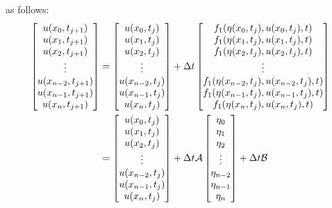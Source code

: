 \documentclass[10pt,reqno,oneside,a4paper]{article}
\begin{document}
as follows:
\begin{align*}
\begin{bmatrix}
u(x_0, t_{j+1}) \\
u(x_1, t_{j+1}) \\
u(x_2, t_{j+1}) \\
\vdots \\
u(x_{n-2}, t_{j+1}) \\
u(x_{n-1}, t_{j+1}) \\
u(x_n, t_{j+1}) 
\end{bmatrix} 
&= 
\begin{bmatrix}
u(x_0, t_{j}) \\
u(x_1, t_{j}) \\
u(x_2, t_{j}) \\
\vdots \\
u(x_{n-2}, t_{j}) \\
u(x_{n-1}, t_{j}) \\
u(x_n, t_{j}) 
\end{bmatrix} 
+ \Delta t 
\begin{bmatrix}
f_1(\eta(x_0, t_j), u(x_0, t_j), t)\\
f_1(\eta(x_1, t_j), u(x_1, t_j), t) \\
 f_1(\eta(x_2, t_j), u(x_2, t_j), t) \\
\vdots \\
f_1(\eta(x_{n-2}, t_j), u(x_{n-2}, t_j), t)\\
f_1(\eta(x_{n-1}, t_j), u(x_{n-1}, t_j), t) \\
f_1(\eta(x_n, t_j), u(x_n, t_j), t) 
\end{bmatrix} \\
&= 
\begin{bmatrix}
u(x_0, t_{j}) \\
u(x_1, t_{j}) \\
u(x_2, t_{j}) \\
\vdots \\
u(x_{n-2}, t_{j}) \\
u(x_{n-1}, t_{j}) \\
u(x_n, t_{j}) 
\end{bmatrix} 
+ \Delta t \mathcal{A} \begin{bmatrix}
\eta_0 \\
\eta_1 \\
\eta_2 \\
\vdots \\
\eta_{n-2} \\
\eta_{n-1} \\
\eta_{n}
\end{bmatrix}
+ \Delta t \mathcal{B}
\end{align*}
\end{document}
